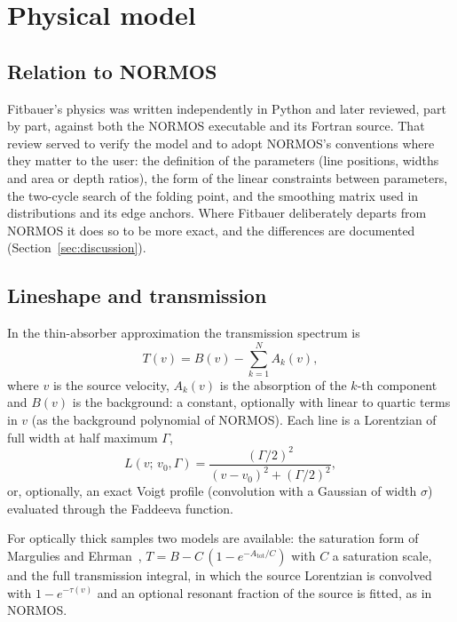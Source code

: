 \documentclass[smallcondensed]{svjour3}
\begin{document}
\section{Physical model}
\label{sec:model}

\subsection{Relation to NORMOS}

Fitbauer's physics was written independently in Python and later reviewed,
part by part, against both the NORMOS executable and its Fortran source.
That review served to verify the model and to adopt NORMOS's conventions
where they matter to the user: the definition of the parameters (line
positions, widths and area or depth ratios), the form of the linear
constraints between parameters, the two-cycle search of the folding point,
and the smoothing matrix used in distributions and its edge anchors. Where Fitbauer deliberately departs from
NORMOS it does so to be more exact, and the differences are documented
(Section~\ref{sec:discussion}).

\subsection{Lineshape and transmission}

In the thin-absorber approximation the transmission spectrum is
\begin{equation}
  T(v) = B(v) - \sum_{k=1}^{N} A_k(v) ,
  \label{eq:model}
\end{equation}
where $v$ is the source velocity, $A_k(v)$ is the absorption of the
$k$-th component and $B(v)$ is the background: a constant, optionally
with linear to quartic terms in $v$ (as the background polynomial of NORMOS).
Each line is a Lorentzian of full width at half maximum $\Gamma$,
\begin{equation}
  L(v;\, v_0,\Gamma) = \frac{(\Gamma/2)^2}{(v-v_0)^2 + (\Gamma/2)^2} ,
\end{equation}
or, optionally, an exact Voigt profile (convolution with a Gaussian of
width $\sigma$) evaluated through the Faddeeva function.

For optically thick samples two models are available: the saturation form
of Margulies and Ehrman~\cite{Margulies1961},
$T = B - C\,(1 - e^{-A_\mathrm{tot}/C})$ with $C$ a saturation scale, and
the full transmission integral, in which the source Lorentzian is
convolved with $1 - e^{-\tau(v)}$ and an optional resonant fraction of the
source is fitted, as in NORMOS.
\end{document}
